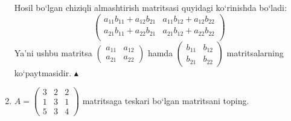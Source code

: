 \begin{enumerate}
Hosil bo`lgan chiziqli almashtirish matritsasi quyidagi ko`rinishda bo`ladi:
$$\begin{pmatrix}
	a_{11}b_{11}+a_{12}b_{21}&a_{11}b_{12}+a_{12}b_{22}\\
	a_{21}b_{11}+a_{22}b_{21}&a_{21}b_{12}+a_{22}b_{22}\\
\end{pmatrix}$$
Ya'ni ushbu matritsa $\begin{pmatrix}
	a_{11}&a_{12}\\a_{21}&a_{22}
\end{pmatrix}$ hamda $\begin{pmatrix}
b_{11}&b_{12}\\b_{21}&b_{22}
\end{pmatrix}$ matritsalarning ko`paytmasidir. $\blacktriangle$
\item $A=\begin{pmatrix}
	3&2&2\\1&3&1\\5&3&4
\end{pmatrix}$ matritsaga teskari bo`lgan matritsani toping.


\end{enumerate}

